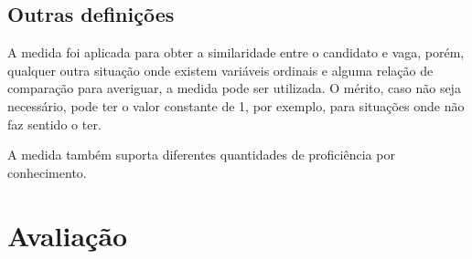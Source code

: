 \documentclass[preprint,12pt]{elsarticle}
\begin{document}


    

\subsection{Outras definições}

A medida foi aplicada para obter a similaridade entre o candidato e vaga, porém, qualquer outra situação onde existem variáveis ordinais e alguma relação de comparação para averiguar, a medida pode ser utilizada. O mérito, caso não seja necessário, pode ter o valor constante de 1, por exemplo, para situações onde não faz sentido o ter.

A medida também suporta diferentes quantidades de proficiência por conhecimento.

\section{Avaliação}
\label{sec:sample4}
\end{document}
